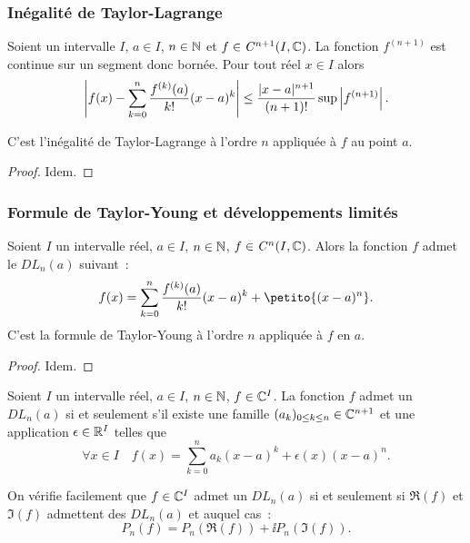 \subsubsection{Inégalité de Taylor-Lagrange}

\begin{theo}
  Soient un intervalle $I$, $a \in I$, $n \in \mathbb{N}$ et $f \in \mathit{C}^{n+1} (I,\mathbb{C})$. La fonction $f^{(n+1)}$ est continue sur un segment donc bornée. Pour tout réel $x \in I$ alors
  \begin{equation}
    \left|f(x)-\sum_{k=0}^n \frac{f^{(k)}(a)}{k!}(x-a)^k\right| \leq \frac{|x-a|^{n+1}}{(n+1)!} \sup \left\lvert f^{(n+1)}\right\rvert.
  \end{equation}

C'est l'inégalité de Taylor-Lagrange à l'ordre $n$ appliquée à $f$ au point $a$.
\end{theo}
\begin{proof}
  Idem.
\end{proof}

\subsubsection{Formule de Taylor-Young et développements limités}

\begin{theo}
  Soient $I$ un intervalle réel, $a \in I$, $n \in \mathbb{N}$, $f \in \mathit{C}^n(I,\mathbb{C})$. Alors la fonction $f$ admet le $DL_n(a)$ suivant~:
  \begin{equation}
    f(x) = \sum_{k=0}^n \frac{f^{(k)}(a)}{k!} (x-a)^k + \petito{(x-a)^n}.
  \end{equation}
  C'est la formule de Taylor-Young à l'ordre $n$ appliquée à $f$ en $a$.
\end{theo}
\begin{proof}
  Idem.
\end{proof}

\begin{defdef}
  Soient $I$ un intervalle réel, $a \in I$, $n \in \mathbb{N}$, $f \in \mathbb{C}^I$. La fonction $f$ admet un $DL_n(a)$ si et seulement s'il existe une famille $(a_k)_{0\leq k\leq n} \in \mathbb{C}^{n+1}$ et une application $\epsilon \in \mathbb{R}^I$ telles que
  \begin{equation}
    \forall x \in I \quad f(x)=\sum_{k=0}^n a_k (x-a)^k + \epsilon(x)(x-a)^n.
  \end{equation}
  
  On vérifie facilement que $f\in \mathbb{C}^I$ admet un $DL_n(a)$ si et seulement si $\Re(f)$ et $\Im(f)$ admettent des $DL_n(a)$ et auquel cas~:
  \begin{equation}
    P_n(f) = P_n(\Re(f)) + \ii P_n(\Im(f)).
  \end{equation}  
\end{defdef}